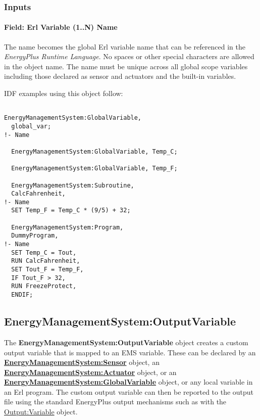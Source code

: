 \subsubsection{Inputs}\label{inputs-5-009}

\paragraph{Field: Erl Variable (1..N) Name}\label{field-erl-variable-1..n-name}

The name becomes the global Erl variable name that can be referenced in the \emph{EnergyPlus Runtime Language}. No spaces or other special characters are allowed in the object name. The name must be unique across all global scope variables including those declared as sensor and actuators and the built-in variables.

IDF examples using this object follow:

\begin{lstlisting}

EnergyManagementSystem:GlobalVariable,
  global_var;                                                                   !- Name

  EnergyManagementSystem:GlobalVariable, Temp_C;

  EnergyManagementSystem:GlobalVariable, Temp_F;

  EnergyManagementSystem:Subroutine,
  CalcFahrenheit,                                                           !- Name
  SET Temp_F = Temp_C * (9/5) + 32;

  EnergyManagementSystem:Program,
  DummyProgram,                                                               !- Name
  SET Temp_C = Tout,
  RUN CalcFahrenheit,
  SET Tout_F = Temp_F,
  IF Tout_F > 32,
  RUN FreezeProtect,
  ENDIF;
\end{lstlisting}

\subsection{EnergyManagementSystem:OutputVariable}\label{energymanagementsystemoutputvariable}

The \textbf{EnergyManagementSystem:OutputVariable} object creates a custom output variable that is mapped to an EMS variable. These can be declared by an \textbf{\hyperref[energymanagementsystemsensor]{EnergyManagementSystem:Sensor}} object, an \textbf{\hyperref[energymanagementsystemactuator]{EnergyManagementSystem:Actuator}} object, or an \textbf{\hyperref[energymanagementsystemglobalvariable]{EnergyManagementSystem:GlobalVariable}} object, or any local variable in an Erl program. The custom output variable can then be reported to the output file using the standard EnergyPlus output mechanisms such as with the \hyperref[outputvariable]{Output:Variable} object.

